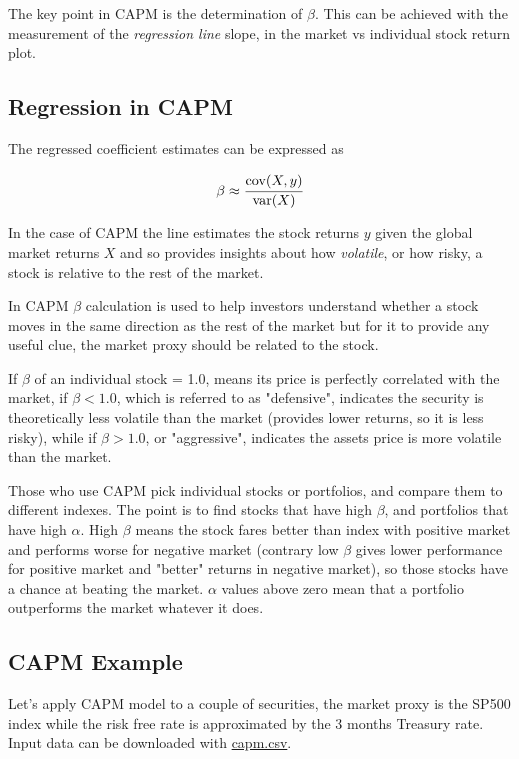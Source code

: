 The key point in CAPM is the determination of $\beta$. This can be achieved with the measurement of the \emph{regression line} slope, in the market vs individual stock return plot.

\subsection{Regression in CAPM}

The regressed coefficient estimates can be expressed as 

\begin{equation}
	\beta \approx \cfrac{\textrm{cov}(X,y)}{\textrm {var}(X)}
\end{equation}

In the case of CAPM the line estimates the stock returns $y$ given the global market returns $X$ and so provides insights about how \emph{volatile}, or how risky, a stock is relative to the rest of the market.

In CAPM $\beta$ calculation is used to help investors understand whether a stock moves in the same direction as the rest of the market but for it to provide any useful clue, the market proxy should be related to the stock.

If $\beta$ of an individual stock = 1.0, means its price is perfectly correlated with the market, if $\beta < 1.0$, which is referred to as "defensive", indicates the security is theoretically less volatile than the market (provides lower returns, so it is less risky), while if $\beta > 1.0$, or "aggressive", indicates the assets price is more volatile than the market.

Those who use CAPM pick individual stocks or portfolios, and compare them to different indexes. The point is to find stocks that have high $\beta$, and portfolios that have high $\alpha$. High $\beta$ means the stock fares better than index with positive market and performs worse for negative market (contrary low $\beta$ gives lower performance for positive market and "better" returns in negative market), so those stocks have a chance at beating the market. $\alpha$ values above zero mean that a portfolio outperforms the market whatever it does.

\subsection{CAPM Example}
\label{sec:linear_regression}
Let's apply CAPM model to a couple of securities, the market proxy is the SP500 index while the risk free rate is approximated by the 3 months Treasury rate.
Input data can be downloaded with \href{https://raw.githubusercontent.com/matteosan1/finance_course/develop/libro/input_files/capm.csv}{capm.csv}.

